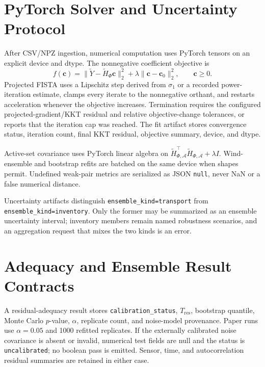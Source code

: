 \section{PyTorch Solver and Uncertainty Protocol}
\label{app:pytorch_solver}

After CSV/NPZ ingestion, numerical computation uses PyTorch tensors on an
explicit device and dtype.  The nonnegative coefficient objective is
\begin{equation}
f(\mathbf c)=
\|\widetilde Y-\widetilde H_\Phi\mathbf c\|_2^2
+\lambda\|\mathbf c-\mathbf c_0\|_2^2,
\qquad \mathbf c\ge0.
\label{eq:appendix_fista_objective}
\end{equation}
Projected FISTA uses a Lipschitz step derived from \(\sigma_1\) or a recorded
power-iteration estimate, clamps every iterate to the nonnegative orthant, and
restarts acceleration whenever the objective increases.  Termination requires
the configured projected-gradient/KKT residual and relative objective-change
tolerances, or reports that the iteration cap was reached.  The fit artifact
stores convergence status, iteration count, final KKT residual, objective
summary, device, and dtype.

Active-set covariance uses PyTorch linear algebra on
\(\widetilde H_{\Phi,\mathcal A}^{\top}
\widetilde H_{\Phi,\mathcal A}+\lambda I\).  Wind-ensemble and bootstrap refits
are batched on the same device when shapes permit.  Undefined weak-pair metrics
are serialized as JSON \texttt{null}, never NaN or a false numerical distance.

Uncertainty artifacts distinguish \texttt{ensemble\_kind=transport} from
\texttt{ensemble\_kind=inventory}.  Only the former may be summarized as an
ensemble uncertainty interval; inventory members remain named robustness
scenarios, and an aggregation request that mixes the two kinds is an error.

\section{Adequacy and Ensemble Result Contracts}
\label{app:adequacy_contracts}

A residual-adequacy result stores \texttt{calibration\_status},
\(T_{\mathrm{res}}\), bootstrap quantile, Monte Carlo \(p\)-value,
\(\alpha\), replicate count, and noise-model provenance.  Paper runs use
\(\alpha=0.05\) and 1000 refitted replicates.  If the externally calibrated
noise covariance is absent or invalid, numerical test fields are null and the
status is \texttt{uncalibrated}; no boolean pass is emitted.  Sensor, time, and
autocorrelation residual summaries are retained in either case.

